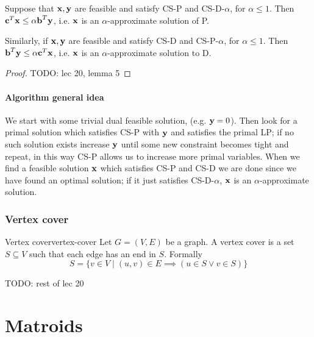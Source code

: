 \documentclass[12pt]{extarticle}
\renewcommand{\vec}[1]{\bvec{#1}}
\begin{document}
\begin{proposition}{}{}
	Suppose that $\vec x, \vec y$ are feasible and satisfy CS-P and CS-D-$\alpha$,
	for $\alpha \leq 1$. Then $\vec c^T \vec x \leq \alpha \vec b^T \vec y$, i.e. $\vec x$ is an
	$\alpha$-approximate solution of P.

	Similarly, if $\vec x, \vec y$ are feasible and satisfy CS-D and CS-P-$\alpha$,
	for $\alpha \leq 1$. Then $\vec b^T \vec y \leq \alpha \vec c^T \vec x$, i.e. $\vec x$ is an
	$\alpha$-approximate solution to D.
\end{proposition}

\begin{proof}
	TODO: lec 20, lemma 5
\end{proof}

\paragraph{Algorithm general idea}

We start with some trivial dual feasible solution, (e.g. $\vec y = 0$).
Then look for a primal solution which satisfies CS-P with $\vec y$ and satisfies the primal LP; if
no such solution exists increase $\vec y$ until some new constraint becomes tight and repeat, in
this way CS-P allows us to increase more primal variables.
When we find a feasible solution $\vec x$ which satisfies CS-P and CS-D we are done since we have
found an optimal solution; if it just satisfies CS-D-$\alpha$, $\vec x$ is an $\alpha$-approximate
solution.

\subsubsection{Vertex cover}

\begin{definition}{Vertex cover}{vertex-cover}
	Let $G = (V, E)$ be a graph. A vertex cover is a set $S \subseteq V$ such that each edge has an
	end in $S$. Formally
	\begin{equation}
		S = \{ v \in V \mid (u, v) \in E \implies (u \in S \lor v \in S) \}
	\end{equation}
\end{definition}

TODO: rest of lec 20

\section{Matroids}
\end{document}
